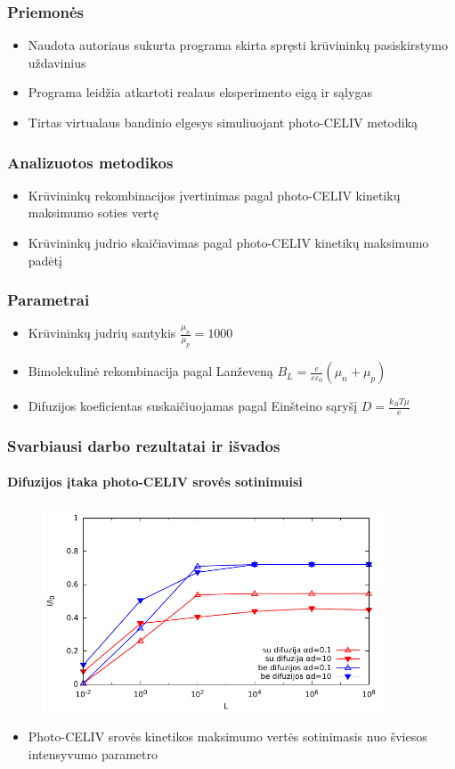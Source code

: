 \documentclass{beamer}
\begin{document}
  \begin{frame}
    \frametitle{Priemonės}
    \begin{itemize}
	\item Naudota autoriaus sukurta programa skirta spręsti krūvininkų pasiskirstymo uždavinius
	\item Programa leidžia atkartoti realaus eksperimento eigą ir sąlygas 
	\item Tirtas virtualaus bandinio elgesys simuliuojant photo-CELIV metodiką
	\end{itemize}        
  \end{frame}
  \begin{frame}
  	\frametitle{Analizuotos metodikos}
  	\begin{itemize}
  	\item Krūvininkų rekombinacijos įvertinimas pagal photo-CELIV kinetikų maksimumo soties vertę
  	\item Krūvininkų judrio skaičiavimas pagal photo-CELIV kinetikų maksimumo padėtį
  	\end{itemize}
  \end{frame}
  \begin{frame}
    \frametitle{Parametrai}
    \begin{itemize}
	\item Krūvininkų judrių santykis \(\frac{\mu_n}{\mu_p} = 1000\)
	\item Bimolekulinė rekombinacija pagal Lanževeną \(B_L=\frac{e}{\varepsilon \varepsilon_0}(\mu_n+\mu_p)\)
	\item Difuzijos koeficientas suskaičiuojamas pagal Einšteino sąryšį \(D=\frac{k_B T \mu }{e}\)
	\end{itemize}
  \end{frame}

  \begin{frame}
    \frametitle{Svarbiausi darbo rezultatai ir išvados}
    \framesubtitle{Difuzijos įtaka photo-CELIV srovės sotinimuisi}
    \begin{figure}
    	\includegraphics[width=0.9\textwidth]{./media/pdf/semilogsaturation.pdf}
    \end{figure}
    \begin{itemize}
    \item Photo-CELIV srovės kinetikos maksimumo vertės sotinimasis nuo šviesos intensyvumo parametro
    \end{itemize}
  \end{frame}
    
\end{document}
